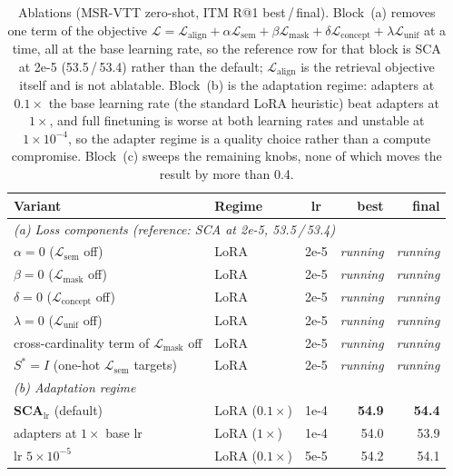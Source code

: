 \begin{table}[t]
\centering
\caption{Ablations (MSR-VTT zero-shot, ITM R@1 best\,/\,final). Block~(a) removes one term
of the objective $\mathcal{L}=\mathcal{L}_{\text{align}}+\alpha\mathcal{L}_{\text{sem}}
+\beta\mathcal{L}_{\text{mask}}+\delta\mathcal{L}_{\text{concept}}
+\lambda\mathcal{L}_{\text{unif}}$ at a time, all at the base learning rate, so the
reference row for that block is SCA at 2e-5 (53.5\,/\,53.4) rather than the default;
$\mathcal{L}_{\text{align}}$ is the retrieval objective itself and is not ablatable.
Block~(b) is the adaptation regime: adapters at $0.1\times$ the base learning rate (the
standard LoRA heuristic) beat adapters at $1\times$, and full finetuning is worse at both
learning rates and unstable at $1\!\times\!10^{-4}$, so the adapter regime is a quality
choice rather than a compute compromise. Block~(c) sweeps the remaining knobs, none of
which moves the result by more than 0.4.}
\label{tab:ablate}
\small
\begin{tabular}{llcrr}
\toprule
Variant & Regime & lr & best & final \\
\midrule
\multicolumn{5}{l}{\emph{(a) Loss components (reference: SCA at 2e-5, 53.5\,/\,53.4)}} \\
$\alpha=0$ ($\mathcal{L}_{\text{sem}}$ off) & LoRA & 2e-5 & \emph{running} & \emph{running} \\
$\beta=0$ ($\mathcal{L}_{\text{mask}}$ off) & LoRA & 2e-5 & \emph{running} & \emph{running} \\
$\delta=0$ ($\mathcal{L}_{\text{concept}}$ off) & LoRA & 2e-5 & \emph{running} & \emph{running} \\
$\lambda=0$ ($\mathcal{L}_{\text{unif}}$ off) & LoRA & 2e-5 & \emph{running} & \emph{running} \\
\quad cross-cardinality term of $\mathcal{L}_{\text{mask}}$ off & LoRA & 2e-5 & \emph{running} & \emph{running} \\
\quad $S^{*}\!=\!I$ (one-hot $\mathcal{L}_{\text{sem}}$ targets) & LoRA & 2e-5 & \emph{running} & \emph{running} \\
\midrule
\multicolumn{5}{l}{\emph{(b) Adaptation regime}} \\
\textbf{SCA}$_{\text{lr}}$ (default) & LoRA ($0.1\times$) & 1e-4 & \textbf{54.9} & \textbf{54.4} \\
\quad adapters at $1\times$ base lr & LoRA ($1\times$) & 1e-4 & 54.0 & 53.9 \\
\quad lr $5\!\times\!10^{-5}$ & LoRA ($0.1\times$) & 5e-5 & 54.2 & 54.1 \\

\end{tabular}
\end{table}
